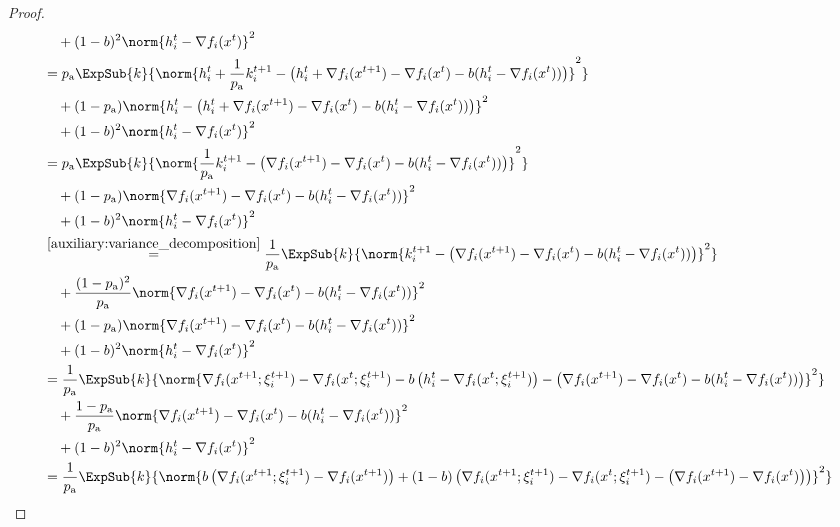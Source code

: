 \documentclass{article}
\newcommand*{\probavailable}{\ensuremath{p_{\textnormal{a}}}}
\begin{document}
\begin{proof}
\begin{align*}
    &\quad + (1 - b)^2\norm{h^t_i - \nabla f_i(x^{t})}^2 \\
    &=\probavailable \ExpSub{k}{\norm{h^{t}_i + \frac{1}{\probavailable}k^{t+1}_i - \left(h^{t}_i + \nabla f_i(x^{t+1}) - \nabla f_i(x^{t}) - b(h^t_i - \nabla f_i(x^{t}))\right)}^2} \\
    &\quad + (1 - \probavailable)\norm{h^{t}_i - \left(h^{t}_i + \nabla f_i(x^{t+1}) - \nabla f_i(x^{t}) - b(h^t_i - \nabla f_i(x^{t}))\right)}^2 \\
    &\quad + (1 - b)^2\norm{h^t_i - \nabla f_i(x^{t})}^2 \\
    &=\probavailable \ExpSub{k}{\norm{\frac{1}{\probavailable}k^{t+1}_i - \left(\nabla f_i(x^{t+1}) - \nabla f_i(x^{t}) - b(h^t_i - \nabla f_i(x^{t}))\right)}^2} \\
    &\quad + (1 - \probavailable)\norm{\nabla f_i(x^{t+1}) - \nabla f_i(x^{t}) - b(h^t_i - \nabla f_i(x^{t}))}^2 \\
    &\quad + (1 - b)^2\norm{h^t_i - \nabla f_i(x^{t})}^2 \\
    &\overset{\eqref{auxiliary:variance_decomposition}}{=}\frac{1}{\probavailable} \ExpSub{k}{\norm{k^{t+1}_i - \left(\nabla f_i(x^{t+1}) - \nabla f_i(x^{t}) - b(h^t_i - \nabla f_i(x^{t}))\right)}^2} \\
    &\quad + \frac{(1 - \probavailable)^2}{\probavailable} \norm{\nabla f_i(x^{t+1}) - \nabla f_i(x^{t}) - b(h^t_i - \nabla f_i(x^{t}))}^2 \\
    &\quad + (1 - \probavailable)\norm{\nabla f_i(x^{t+1}) - \nabla f_i(x^{t}) - b(h^t_i - \nabla f_i(x^{t}))}^2 \\
    &\quad + (1 - b)^2\norm{h^t_i - \nabla f_i(x^{t})}^2 \\
    &=\frac{1}{\probavailable} \ExpSub{k}{\norm{\nabla f_i(x^{t+1};\xi^{t+1}_{i}) - \nabla f_i(x^{t};\xi^{t+1}_{i}) - b \left(h^t_i - \nabla f_i(x^{t};\xi^{t+1}_{i})\right) - \left(\nabla f_i(x^{t+1}) - \nabla f_i(x^{t}) - b(h^t_i - \nabla f_i(x^{t}))\right)}^2} \\
    &\quad + \frac{1 - \probavailable}{\probavailable} \norm{\nabla f_i(x^{t+1}) - \nabla f_i(x^{t}) - b(h^t_i - \nabla f_i(x^{t}))}^2 \\
    &\quad + (1 - b)^2\norm{h^t_i - \nabla f_i(x^{t})}^2 \\
    &=\frac{1}{\probavailable} \ExpSub{k}{\norm{b \left(\nabla f_i(x^{t+1};\xi^{t+1}_{i}) - \nabla f_i(x^{t+1})\right) + (1 - b) \left(\nabla f_i(x^{t+1};\xi^{t+1}_{i}) - \nabla f_i(x^{t};\xi^{t+1}_{i}) - \left(\nabla f_i(x^{t+1}) - \nabla f_i(x^{t})\right)\right)}^2} \\

\end{align*}
\end{proof}
\end{document}
